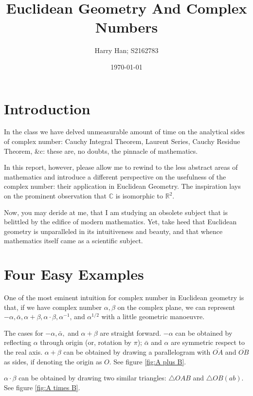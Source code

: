 \documentclass[12pt, a4paper]{article}
\title{Euclidean Geometry And Complex Numbers}
\author{Harry Han; S2162783}
\date{\today}
\theoremstyle{definition}
\theoremstyle{remark}
\newcommand{\bb}[1]{\mathbb{#1}}
\begin{document}
\maketitle
\section{Introduction}

In the class we have delved unmeasurable amount of time on the analytical sides of complex number: Cauchy Integral Theorem, Laurent Series, Cauchy Residue Theorem, \&c: these are, no doubts, the pinnacle of mathematics. \cite{gratwick_2023_HCoV}

In this report, however, please allow me to rewind to the less abstract areas of mathematics and introduce a different perspective on the usefulness of the complex number: their application in Euclidean Geometry. 
The inspiration lays on the prominent observation that $\bb{C}$ is isomorphic to $\bb{R}^2$. \cite{DrawingWithComplexNumbers}

Now, you may deride at me, that I am studying an obsolete subject that is belittled by the edifice of modern mathematics. 
Yet, take heed that Euclidean geometry is unparalleled in its intuitiveness and beauty, and that whence mathematics itself came as a scientific subject.

\section{Four Easy Examples}

One of the most eminent intuition for complex number in Euclidean geometry is that, if we have complex number $\alpha, \beta$ on the complex plane, we can represent $-\alpha, \bar{\alpha}, \alpha + \beta, \alpha \cdot \beta, \alpha^{-1}$, and $\alpha^{1/2}$ with a little geometric manoeuvre. \cite{theoryOfFunctions}

The cases for $-\alpha, \bar{\alpha},$ and $\alpha + \beta$ are straight forward. 
$-\alpha$ can be obtained by reflecting $\alpha$ through origin (or, rotation by $\pi$); $\bar{\alpha}$ and $\alpha$ are symmetric respect to the real axis. 
$\alpha + \beta$ can be obtained by drawing a parallelogram with $\overline{OA}$ and $\overline{OB}$ as sides, if denoting the origin as $O$. See figure \ref{fig:A plus B}.

$\alpha \cdot \beta$ can be obtained by drawing two similar triangles: $\triangle OAB$ and $\triangle OB(ab)$. See figure \ref{fig:A times B}.
\end{document}
